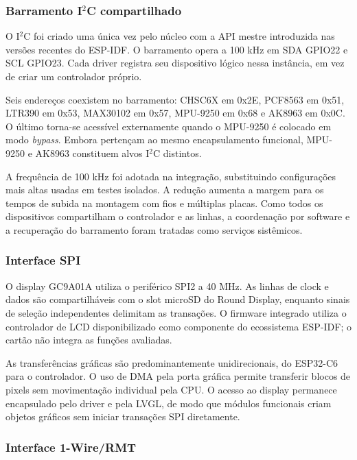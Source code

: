 \documentclass[a4paper,12pt]{article}
\begin{document}
\subsubsection{Barramento I$^2$C compartilhado}


O I$^2$C foi criado uma \'unica vez pelo n\'ucleo com a API mestre introduzida nas vers\~oes recentes do ESP-IDF. O barramento opera a 100 kHz em SDA GPIO22 e SCL GPIO23. Cada driver registra seu dispositivo l\'ogico nessa inst\^ancia, em vez de criar um controlador pr\'oprio.


Seis endere\c{c}os coexistem no barramento: CHSC6X em 0x2E, PCF8563 em 0x51, LTR390 em 0x53, MAX30102 em 0x57, MPU-9250 em 0x68 e AK8963 em 0x0C. O \'ultimo torna-se acess\'ivel externamente quando o MPU-9250 \'e colocado em modo \emph{bypass}. Embora perten\c{c}am ao mesmo encapsulamento funcional, MPU-9250 e AK8963 constituem alvos I$^2$C distintos.


A frequ\^encia de 100 kHz foi adotada na integra\c{c}\~ao, substituindo configura\c{c}\~oes mais altas usadas em testes isolados. A redu\c{c}\~ao aumenta a margem para os tempos de subida na montagem com fios e m\'ultiplas placas. Como todos os dispositivos compartilham o controlador e as linhas, a coordena\c{c}\~ao por software e a recupera\c{c}\~ao do barramento foram tratadas como servi\c{c}os sist\^emicos.


\subsubsection{Interface SPI}


O display GC9A01A utiliza o perif\'erico SPI2 a 40 MHz. As linhas de clock e dados s\~ao compartilh\'aveis com o slot microSD do Round Display, enquanto sinais de sele\c{c}\~ao independentes delimitam as transa\c{c}\~oes. O firmware integrado utiliza o controlador de LCD disponibilizado como componente do ecossistema ESP-IDF; o cart\~ao n\~ao integra as fun\c{c}\~oes avaliadas.


As transfer\^encias gr\'aficas s\~ao predominantemente unidirecionais, do ESP32-C6 para o controlador. O uso de DMA pela porta gr\'afica permite transferir blocos de pixels sem movimenta\c{c}\~ao individual pela CPU. O acesso ao display permanece encapsulado pelo driver e pela LVGL, de modo que m\'odulos funcionais criam objetos gr\'aficos sem iniciar transa\c{c}\~oes SPI diretamente.


\subsubsection{Interface 1-Wire/RMT}
\end{document}
